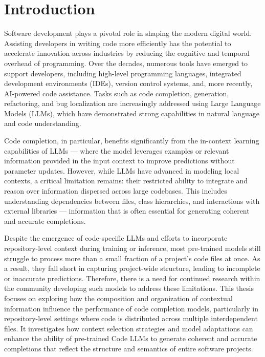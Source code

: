 \chapter*{Introduction}

Software development plays a pivotal role in shaping the modern digital world. Assisting developers in writing code more efficiently has the potential to accelerate innovation across industries by reducing the cognitive and temporal overhead of programming. Over the decades, numerous tools have emerged to support developers, including high-level programming languages, integrated development environments (IDEs), version control systems, and, more recently, AI-powered code assistance. Tasks such as code completion, generation, refactoring, and bug localization are increasingly addressed using Large Language Models (LLMs), which have demonstrated strong capabilities in natural language and code understanding.

Code completion, in particular, benefits significantly from the in-context learning capabilities of LLMs — where the model leverages examples or relevant information provided in the input context to improve predictions without parameter updates. However, while LLMs have advanced in modeling local contexts, a critical limitation remains: their restricted ability to integrate and reason over information dispersed across large codebases. This includes understanding dependencies between files, class hierarchies, and interactions with external libraries — information that is often essential for generating coherent and accurate completions.

Despite the emergence of code-specific LLMs and efforts to incorporate repository-level context during training or inference, most pre-trained models still struggle to process more than a small fraction of a project's code files at once. As a result, they fall short in capturing project-wide structure, leading to incomplete or inaccurate predictions. Therefore, there is a need for continued research within the community developing such models to address these limitations. This thesis focuses on exploring how the composition and organization of contextual information influence the performance of code completion models, particularly in repository-level settings where code is distributed across multiple interdependent files. It investigates how context selection strategies and model adaptations can enhance the ability of pre-trained Code LLMs to generate coherent and accurate completions that reflect the structure and semantics of entire software projects.

